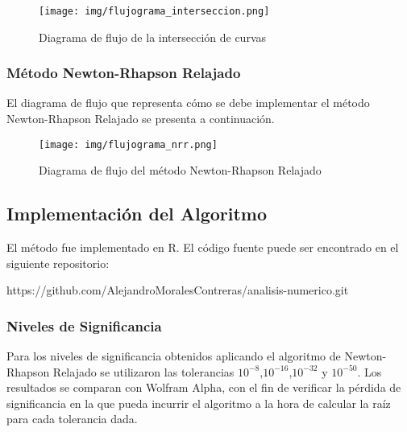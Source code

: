\documentclass[a4paper,12pt]{article}
\begin{document}
\vspace{1em}

\begin{figure}[h!]
\centering
\texttt{[image: img/flujograma\_interseccion.png]}
\vspace{-1em}
\caption{Diagrama de flujo de la intersección de curvas}
\label{fig:flujograma_interseccion}
\end{figure}

\newpage

\subsubsection{Método Newton-Rhapson Relajado}

El diagrama de flujo que representa cómo se debe implementar el método Newton-Rhapson Relajado se presenta a continuación.

\begin{figure}[h!]
\centering
\texttt{[image: img/flujograma\_nrr.png]}
\vspace{-1em}
\caption{Diagrama de flujo del método Newton-Rhapson Relajado}
\label{fig:flujograma_nrr}
\end{figure}

\newpage

\subsection{Implementación del Algoritmo}

El método fue implementado en R. El código fuente puede ser encontrado en el siguiente repositorio: \par

\vspace{1em}
https://github.com/AlejandroMoralesContreras/analisis-numerico.git \par

\subsubsection{Niveles de Significancia}

Para los niveles de significancia obtenidos aplicando el algoritmo de Newton-Rhapson Relajado se utilizaron las tolerancias $10^{-8}$,$10^{-16}$,$10^{-32}$ y $10^{-50}$. Los resultados se comparan con Wolfram Alpha, con el fin de verificar la pérdida de significancia en la que pueda incurrir el algoritmo a la hora de calcular la raíz para cada tolerancia dada. \par
\end{document}
